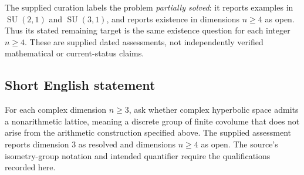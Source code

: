 \documentclass[11pt]{article}
\begin{document}
The supplied curation labels the problem \emph{partially solved}: it reports examples in \(\operatorname{SU}(2,1)\) and \(\operatorname{SU}(3,1)\), and reports existence in dimensions \(n\geq4\) as open. Thus its stated remaining target is the same existence question for each integer \(n\geq4\). These are supplied dated assessments, not independently verified mathematical or current-status claims.
\subsection{Short English statement}
For each complex dimension \(n\geq3\), ask whether complex hyperbolic space admits a nonarithmetic lattice, meaning a discrete group of finite covolume that does not arise from the arithmetic construction specified above. The supplied assessment reports dimension \(3\) as resolved and dimensions \(n\geq4\) as open. The source's isometry-group notation and intended quantifier require the qualifications recorded here.
\end{document}
